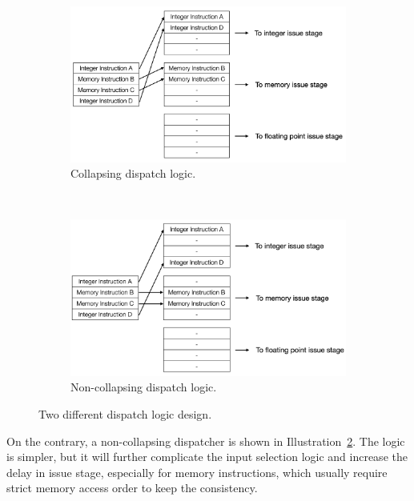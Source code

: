 \begin{figure}[!htp]
    \centering
    \begin{subfigure}{0.45\textwidth}
        \includegraphics[width=\textwidth]{figure/dispatch.png}
        \caption{Collapsing dispatch logic.}
        \label{fig:dp-1}
    \end{subfigure}
    ~
    \begin{subfigure}{0.45\textwidth}
        \includegraphics[width=\textwidth]{figure/dispatch-nc.png}
        \caption{Non-collapsing dispatch logic.}
        \label{fig:dp-2}
    \end{subfigure}
    \caption{Two different dispatch logic design.}
    \label{fig:dispatch}
\end{figure}

On the contrary, a non-collapsing dispatcher is shown in Illustration~\ref{fig:dp-2}. The logic is simpler, but it will further complicate the input selection logic and increase the delay in issue stage, especially for memory instructions, which usually require strict memory access order to keep the consistency.


